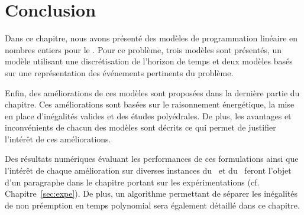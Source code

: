 \section*{Conclusion}

Dans ce chapitre, nous avons présenté des modèles de programmation
linéaire en nombres entiers pour le \CECSP. Pour ce problème, trois
modèles sont présentés,  
un modèle utilisant une discrétisation de l'horizon de temps et deux
modèles basés sur une représentation des événements pertinents du
problème. 

Enfin, des améliorations de ces modèles sont proposées dans la
dernière partie du chapitre. Ces améliorations sont basées sur le
raisonnement énergétique, la mise en place d'inégalités valides et des
études polyédrales. De plus, les avantages et inconvénients de chacun
des modèles sont décrits ce qui permet de justifier l'intérêt de ces
améliorations. 

Des résultats numériques évaluant les performances de ces formulations
ainsi que l'intérêt de chaque amélioration sur diverses instances du
\CECSP~et du \RCPSP~feront l'objet d'un paragraphe dans le chapitre
portant sur les expérimentations (cf. Chapitre~\ref{sec:expe}). De
plus, un algorithme permettant de séparer les inégalités de non
préemption en temps polynomial sera également détaillé dans ce
chapitre.  